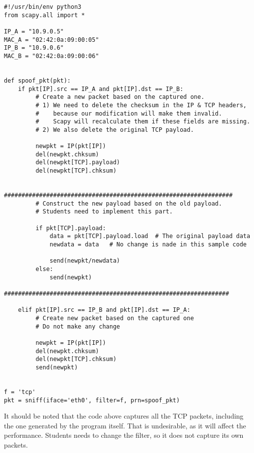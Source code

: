 \begin{lstlisting}
#!/usr/bin/env python3
from scapy.all import *

IP_A = "10.9.0.5"
MAC_A = "02:42:0a:09:00:05"
IP_B = "10.9.0.6"
MAC_B = "02:42:0a:09:00:06"


def spoof_pkt(pkt):
    if pkt[IP].src == IP_A and pkt[IP].dst == IP_B:
         # Create a new packet based on the captured one.
         # 1) We need to delete the checksum in the IP & TCP headers, 
         #    because our modification will make them invalid.
         #    Scapy will recalculate them if these fields are missing. 
         # 2) We also delete the original TCP payload.

         newpkt = IP(pkt[IP])
         del(newpkt.chksum)
         del(newpkt[TCP].payload)
         del(newpkt[TCP].chksum)

         #################################################################
         # Construct the new payload based on the old payload.
         # Students need to implement this part.

         if pkt[TCP].payload:
             data = pkt[TCP].payload.load  # The original payload data
             newdata = data   # No change is nade in this sample code

             send(newpkt/newdata)
         else:
             send(newpkt)
         ################################################################

    elif pkt[IP].src == IP_B and pkt[IP].dst == IP_A:
         # Create new packet based on the captured one 
         # Do not make any change 

         newpkt = IP(pkt[IP])
         del(newpkt.chksum)
         del(newpkt[TCP].chksum)
         send(newpkt)


f = 'tcp'
pkt = sniff(iface='eth0', filter=f, prn=spoof_pkt)
\end{lstlisting}


It should be noted that the code above captures all the TCP 
packets, including the one generated by the program itself. That is 
undesirable, as it will affect
the performance. Students needs to change the filter, so it does not capture 
its own packets. 


